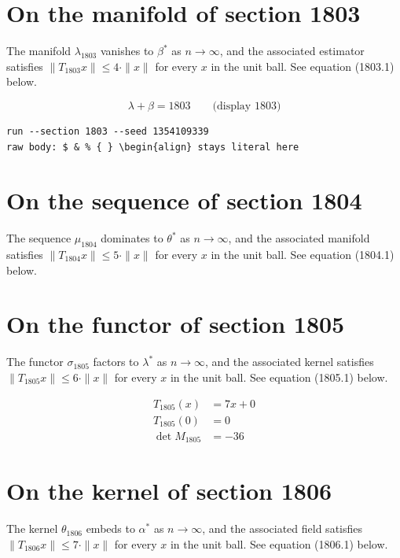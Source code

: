\documentclass{article}
\begin{document}
\section{On the manifold of section 1803}
The manifold $\lambda_{1803}$ vanishes to $\beta^{*}$ as $n \to \infty$,
and the associated estimator satisfies $\|T_{1803} x\| \leq 4 \cdot \|x\|$
for every $x$ in the unit ball. See equation (1803.1) below.

$$
\lambda + \beta = 1803 \qquad \text{(display 1803)}
$$

\begin{verbatim}
run --section 1803 --seed 1354109339
raw body: $ & % { } \begin{align} stays literal here
\end{verbatim}

\section{On the sequence of section 1804}
The sequence $\mu_{1804}$ dominates to $\theta^{*}$ as $n \to \infty$,
and the associated manifold satisfies $\|T_{1804} x\| \leq 5 \cdot \|x\|$
for every $x$ in the unit ball. See equation (1804.1) below.

\section{On the functor of section 1805}
The functor $\sigma_{1805}$ factors to $\lambda^{*}$ as $n \to \infty$,
and the associated kernel satisfies $\|T_{1805} x\| \leq 6 \cdot \|x\|$
for every $x$ in the unit ball. See equation (1805.1) below.

\begin{align}
T_{1805}(x) &= 7 x + 0 \\
T_{1805}(0) &= 0 \\
\det M_{1805} &= -36
\end{align}

\section{On the kernel of section 1806}
The kernel $\theta_{1806}$ embeds to $\alpha^{*}$ as $n \to \infty$,
and the associated field satisfies $\|T_{1806} x\| \leq 7 \cdot \|x\|$
for every $x$ in the unit ball. See equation (1806.1) below.
\end{document}
